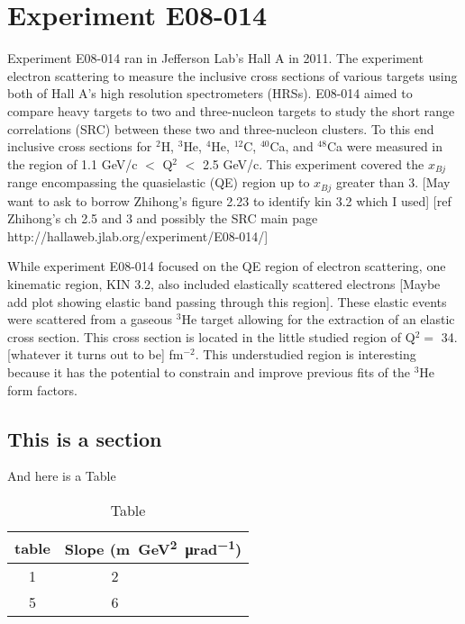 \chapter{Experiment E08-014} %
\label{ch:experiment} %

Experiment E08-014 ran in Jefferson Lab's Hall A in 2011. The experiment electron scattering to measure the inclusive cross sections of various targets using both of Hall A's high resolution spectrometers (HRSs). E08-014 aimed to compare heavy targets to two and three-nucleon targets to study the short range correlations (SRC) between these two and three-nucleon clusters. To this end inclusive cross sections for $^2$H, $^3$He, $^4$He, $^12$C, $^{40}$Ca, and $^{48}$Ca were measured in the region of 1.1 GeV/c $<$ Q$^2$ $<$ 2.5 GeV/c. This experiment covered the $x_{Bj}$ range encompassing the quasielastic (QE) region up to $x_{Bj}$ greater than 3. [May want to ask to borrow Zhihong's figure 2.23 to identify kin 3.2 which I used]  [ref Zhihong's ch 2.5 and 3 and possibly the SRC main page http://hallaweb.jlab.org/experiment/E08-014/]

While experiment E08-014 focused on the QE region of electron scattering, one kinematic region, KIN 3.2, also included elastically scattered electrons [Maybe add plot showing elastic band passing through this region]. These elastic events were scattered from a gaseous $^3$He target allowing for the extraction of an elastic cross section. This cross section is located in the little studied region of Q$^2 = $ 34.[whatever it turns out to be] fm$^{-2}$. This understudied region is interesting because it has the potential to constrain and improve previous fits of the $^3$He form factors. 
\section{This is a section}

And here is a Table

\begin{table}
  \centering
    \begin{tabular}{c  c c}
    \toprule
      table & \multicolumn{2}{c}{Slope (\si{\meter\giga\electronvolt\squared\per\micro\radian})} \\
      \midrule
      1 & 2 \\
      5 & 6\\
      \bottomrule
    \end{tabular}
    \caption[Here is a table]{Table}
    \label{tab:table}
\end{table}


